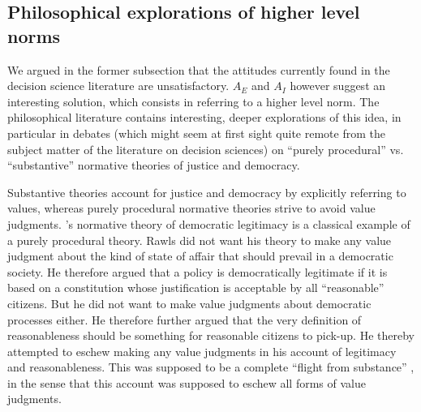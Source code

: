 \documentclass[preprint, french, english, 11pt, authoryear]{elsarticle}%
\begin{document}
\subsection{Philosophical explorations of higher level norms}
\label{sec:higher}
We argued in the former subsection that the attitudes currently found in the decision science literature are unsatisfactory. $A_E$ and $A_I$ however suggest an interesting solution, which consists in referring to a higher level norm. The philosophical literature contains interesting, deeper explorations of this idea, in particular in debates (which might seem at first sight quite remote from the subject matter of the literature on decision sciences) on “purely procedural” vs. “substantive” normative theories of justice and democracy.

Substantive theories account for justice and democracy by explicitly referring to values, whereas purely procedural normative theories strive to avoid value judgments. \cite{rawls_political_2005}'s normative theory of democratic legitimacy is a classical example of a purely procedural theory. Rawls did not want his theory to make any value judgment about the kind of state of affair that should prevail in a democratic society. He therefore argued that a policy is democratically legitimate if it is based on a constitution whose justification is acceptable by all  “reasonable” citizens. But he did not want to make value judgments about democratic processes either. He therefore further argued that the very definition of reasonableness should be something for reasonable citizens to pick-up. He thereby attempted to eschew making any value judgments in his account of legitimacy and reasonableness. This was supposed to be a complete ``flight from substance'' \citep{estlund_democratic_2009}, in the sense that this account was supposed to eschew all forms of value judgments.%
\end{document}
